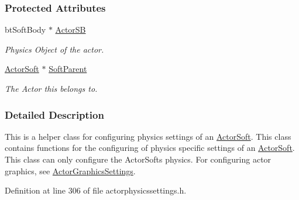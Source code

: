 \subsubsection*{Protected Attributes}
\begin{DoxyCompactItemize}
\item 
\hypertarget{classphys_1_1ActorSoftPhysicsSettings_a0258a8c8ab634b6dc26fd86e8edcc25c}{
btSoftBody $\ast$ \hyperlink{classphys_1_1ActorSoftPhysicsSettings_a0258a8c8ab634b6dc26fd86e8edcc25c}{ActorSB}}
\label{classphys_1_1ActorSoftPhysicsSettings_a0258a8c8ab634b6dc26fd86e8edcc25c}

\begin{DoxyCompactList}\small\item\em Physics Object of the actor. \item\end{DoxyCompactList}\item 
\hypertarget{classphys_1_1ActorSoftPhysicsSettings_a94194a1dd89e643b02181010fcad6bc3}{
\hyperlink{classphys_1_1ActorSoft}{ActorSoft} $\ast$ \hyperlink{classphys_1_1ActorSoftPhysicsSettings_a94194a1dd89e643b02181010fcad6bc3}{SoftParent}}
\label{classphys_1_1ActorSoftPhysicsSettings_a94194a1dd89e643b02181010fcad6bc3}

\begin{DoxyCompactList}\small\item\em The Actor this belongs to. \item\end{DoxyCompactList}\end{DoxyCompactItemize}


\subsubsection{Detailed Description}
This is a helper class for configuring physics settings of an \hyperlink{classphys_1_1ActorSoft}{ActorSoft}. This class contains functions for the configuring of physics specific settings of an \hyperlink{classphys_1_1ActorSoft}{ActorSoft}. This class can only configure the ActorSofts physics. For configuring actor graphics, see \hyperlink{classphys_1_1ActorGraphicsSettings}{ActorGraphicsSettings}. 

Definition at line 306 of file actorphysicssettings.h.



